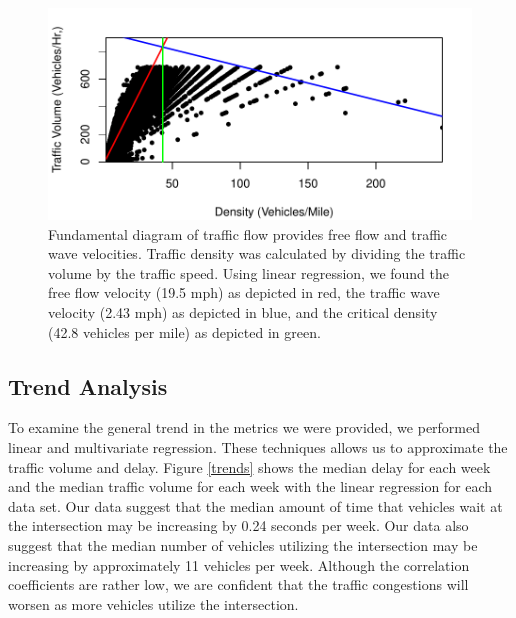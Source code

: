\documentclass{report}
\begin{document}
\begin{figure}[h]
\centering
\includegraphics{upstat_report-003}
\caption{Fundamental diagram of traffic flow provides
free flow and traffic wave velocities. Traffic density was calculated by
dividing the traffic volume by the traffic speed. Using linear regression, we
found the free flow velocity (19.5 mph) as depicted in red, the traffic wave
velocity (2.43 mph) as depicted in blue, and the critical density (42.8 vehicles
per mile) as depicted in green.}
\label{fig:Fundamental}
\end{figure}


\subsection*{Trend Analysis}

To examine the general trend in the metrics we were provided, we performed linear
and multivariate regression. These techniques allows us to approximate the traffic
volume and delay. Figure \ref{trends} shows the median delay for each week and
the median traffic volume for each week with the linear regression for each data
set. Our data suggest that the median amount of time that vehicles wait at the
intersection may be increasing by 0.24 seconds per week. Our data also suggest
that the median number of vehicles utilizing the intersection may be increasing
by approximately 11 vehicles per week. Although the correlation coefficients are
rather low, we are confident that the traffic congestions will worsen as more
vehicles utilize the intersection.
\end{document}

